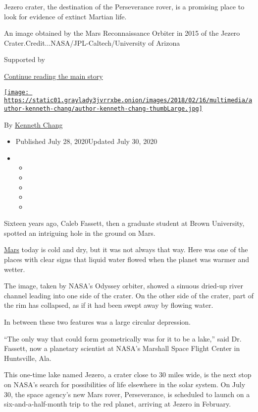 Jezero crater, the destination of the Perseverance rover, is a promising
place to look for evidence of extinct Martian life.

An image obtained by the Mars Reconnaissance Orbiter in 2015 of the
Jezero Crater.Credit...NASA/JPL-Caltech/University of Arizona

Supported by

\protect\hyperlink{after-sponsor}{Continue reading the main story}

\href{https://www.nytimes3xbfgragh.onion/by/kenneth-chang}{\texttt{[image: https://static01.graylady3jvrrxbe.onion/images/2018/02/16/multimedia/author-kenneth-chang/author-kenneth-chang-thumbLarge.jpg]}}

By \href{https://www.nytimes3xbfgragh.onion/by/kenneth-chang}{Kenneth
Chang}

\begin{itemize}
\item
  Published July 28, 2020Updated July 30, 2020
\item
  \begin{itemize}
  \item
  \item
  \item
  \item
  \item
  \end{itemize}
\end{itemize}

Sixteen years ago, Caleb Fassett, then a graduate student at Brown
University, spotted an intriguing hole in the ground on Mars.

\href{https://www.nytimes3xbfgragh.onion/2020/07/30/science/nasa-mars-launch.html}{Mars}
today is cold and dry, but it was not always that way. Here was one of
the places with clear signs that liquid water flowed when the planet was
warmer and wetter.

The image, taken by NASA's Odyssey orbiter, showed a sinuous dried-up
river channel leading into one side of the crater. On the other side of
the crater, part of the rim has collapsed, as if it had been swept away
by flowing water.

In between these two features was a large circular depression.

``The only way that could form geometrically was for it to be a lake,''
said Dr. Fassett, now a planetary scientist at NASA's Marshall Space
Flight Center in Huntsville, Ala.

This one-time lake named Jezero, a crater close to 30 miles wide, is the
next stop on NASA's search for possibilities of life elsewhere in the
solar system. On July 30, the space agency's new Mars rover,
Perseverance, is scheduled to launch on a six-and-a-half-month trip to
the red planet, arriving at Jezero in February.

